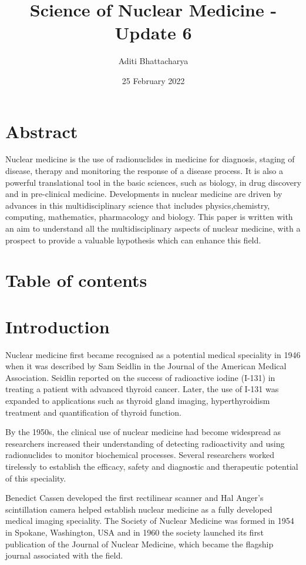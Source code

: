 \documentclass{article}
\title{\textbf{Science of Nuclear Medicine - Update 6}}
\author{Aditi Bhattacharya}
\date{25 February 2022}
\begin{document}
\maketitle
\section*{Abstract}
Nuclear medicine is the use of radionuclides in medicine for diagnosis, staging of disease, therapy and monitoring the response of a disease process. It is also a powerful translational tool in the basic sciences, such as biology, in drug discovery and in pre-clinical medicine. Developments in nuclear medicine are driven by advances in this multidisciplinary science that includes physics,chemistry, computing, mathematics, pharmacology and biology. This paper is written with an aim to understand all the multidisciplinary aspects of nuclear medicine, with a prospect to provide a valuable hypothesis which can enhance this field.

\section*{Table of contents}


\section*{Introduction}
Nuclear medicine first became recognised as a potential medical speciality in 1946 when it was described by Sam Seidlin in the Journal of the American Medical Association. Seidlin reported on the success of radioactive iodine (I-131) in treating a patient with advanced thyroid cancer. Later, the use of I-131 was expanded to applications such as thyroid gland imaging, hyperthyroidism treatment and quantification of thyroid function.

By the 1950s, the clinical use of nuclear medicine had become widespread as researchers increased their understanding of detecting radioactivity and using radionuclides to monitor biochemical processes. Several researchers worked tirelessly to establish the efficacy, safety and diagnostic and therapeutic potential of this speciality.

Benedict Cassen developed the first rectilinear scanner and Hal Anger’s scintillation camera helped establish nuclear medicine as a fully developed medical imaging speciality. The Society of Nuclear Medicine was formed in 1954 in Spokane, Washington, USA and in 1960 the society launched its first publication of the Journal of Nuclear Medicine, which became the flagship journal associated with the field.
\end{document}
